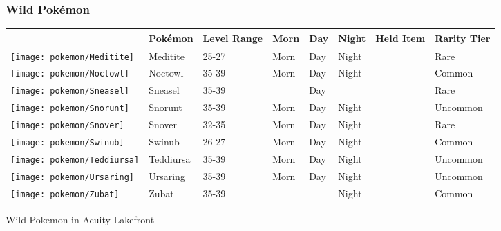 \subsubsection{Wild Pokémon}%
\label{ssubsec:WildPokmon}%
\begin{longtable}{||l l l l l l l l||}%
\hline%
\rowcolor{GroundColor}%
&Pokémon&Level Range&Morn&Day&Night&Held Item&Rarity Tier\\%
\hline%
\endhead%
\hline%
\rowcolor{GroundColor}%
\texttt{[image: pokemon/Meditite]}&Meditite&25{-}27&Morn&Day&Night&&\textcolor{RedOrange}{%
Rare%
}\\%
\hline%
\rowcolor{GroundColor}%
\texttt{[image: pokemon/Noctowl]}&Noctowl&35{-}39&Morn&Day&Night&&\textcolor{black}{%
Common%
}\\%
\hline%
\rowcolor{GroundColor}%
\texttt{[image: pokemon/Sneasel]}&Sneasel&35{-}39&&Day&&&\textcolor{RedOrange}{%
Rare%
}\\%
\hline%
\rowcolor{GroundColor}%
\texttt{[image: pokemon/Snorunt]}&Snorunt&35{-}39&Morn&Day&Night&&\textcolor{OliveGreen}{%
Uncommon%
}\\%
\hline%
\rowcolor{GroundColor}%
\texttt{[image: pokemon/Snover]}&Snover&32{-}35&Morn&Day&Night&&\textcolor{RedOrange}{%
Rare%
}\\%
\hline%
\rowcolor{GroundColor}%
\texttt{[image: pokemon/Swinub]}&Swinub&26{-}27&Morn&Day&Night&&\textcolor{black}{%
Common%
}\\%
\hline%
\rowcolor{GroundColor}%
\texttt{[image: pokemon/Teddiursa]}&Teddiursa&35{-}39&Morn&Day&Night&&\textcolor{OliveGreen}{%
Uncommon%
}\\%
\hline%
\rowcolor{GroundColor}%
\texttt{[image: pokemon/Ursaring]}&Ursaring&35{-}39&Morn&Day&Night&&\textcolor{OliveGreen}{%
Uncommon%
}\\%
\hline%
\rowcolor{GroundColor}%
\texttt{[image: pokemon/Zubat]}&Zubat&35{-}39&&&Night&&\textcolor{black}{%
Common%
}\\%
\hline%
\end{longtable}%
\caption{Wild Pokemon in Acuity Lakefront}